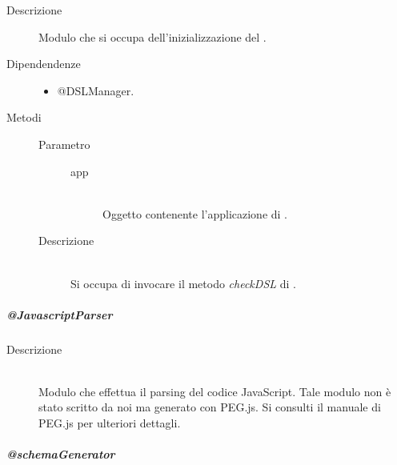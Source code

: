 \begin{description}
 \item[Descrizione] \hfill
  Modulo che si occupa dell'inizializzazione del .
 \item[Dipendendenze] \hfill
 \begin{itemize}
  \item{@DSLManager}.
 \end{itemize}
  
 \item[Metodi]
 \begin{mldescription}
 \hfill
 \begin{description}
     		\item[Parametro] \hfill
     			\begin{description}
     				\item[app] \hfill \\
     				Oggetto contenente l'applicazione di .
     			\end{description}
     		\item[Descrizione] \hfill \\
     		Si occupa di invocare il metodo \textit{checkDSL} di .
   \end{description}
 \end{mldescription}
 
\end{description}
\subparagraph{@JavascriptParser}
\begin{description}
 \item[Descrizione] \hfill \\
  Modulo che effettua il parsing del codice JavaScript. Tale modulo non è stato scritto da noi ma generato con PEG.js. Si consulti il manuale di PEG.js per ulteriori dettagli.
  
 
\end{description}
\subparagraph{@schemaGenerator}
